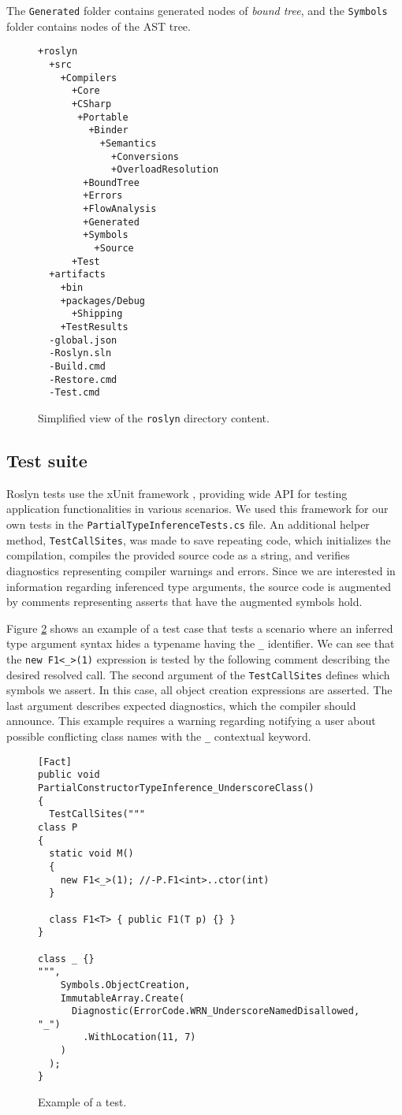 The \texttt{Generated} folder contains generated nodes of \textit{bound tree}, and the \texttt{Symbols} folder contains nodes of the \ac{AST} tree.
\begin{figure}[h]
\begin{lstlisting}
+roslyn
  +src
    +Compilers
      +Core
      +CSharp
       +Portable
         +Binder
           +Semantics
             +Conversions
             +OverloadResolution
        +BoundTree
        +Errors
        +FlowAnalysis
        +Generated
        +Symbols
          +Source
      +Test
  +artifacts
    +bin
    +packages/Debug
      +Shipping
    +TestResults
  -global.json
  -Roslyn.sln
  -Build.cmd
  -Restore.cmd
  -Test.cmd
\end{lstlisting}
\caption{Simplified view of the \texttt{roslyn} directory content.}
\label{img68:roslynFolder}
\end{figure}

\subsection{Test suite}

Roslyn tests use the xUnit framework \cite{online:xUnit}, providing wide API for testing application functionalities in various scenarios. 
We used this framework for our own tests in the \texttt{PartialTypeInferenceTests.cs} file. 
An additional helper method, \texttt{TestCallSites}, was made to save repeating code, which initializes the compilation, compiles the provided source code as a string, and verifies diagnostics representing compiler warnings and errors. 
Since we are interested in information regarding inferenced type arguments, the source code is augmented by comments representing asserts that have the augmented symbols hold.
\par
Figure \ref{img69:test} shows an example of a test case that tests a scenario where an inferred type argument syntax hides a typename having the \texttt{\_}  identifier. 
We can see that the \texttt{new F1<\_>(1)} expression is tested by the following comment describing the desired resolved call. 
The second argument of the \texttt{TestCallSites} defines which symbols we assert. 
In this case, all object creation expressions are asserted. The last argument describes expected diagnostics, which the compiler should announce. 
This example requires a warning regarding notifying a user about possible conflicting class names with the \texttt{\_} contextual keyword.
\begin{figure}[h]
\begin{lstlisting}[style=csharp, showstringspaces=false]
[Fact]
public void PartialConstructorTypeInference_UnderscoreClass()
{
  TestCallSites("""
class P
{
  static void M() 
  {
    new F1<_>(1); //-P.F1<int>..ctor(int)
  }

  class F1<T> { public F1(T p) {} }
}

class _ {}
""",
    Symbols.ObjectCreation,
    ImmutableArray.Create(
      Diagnostic(ErrorCode.WRN_UnderscoreNamedDisallowed, "_")
        .WithLocation(11, 7)
    )
  );
}
\end{lstlisting}
\caption{Example of a test.}
\label{img69:test}
\end{figure}

